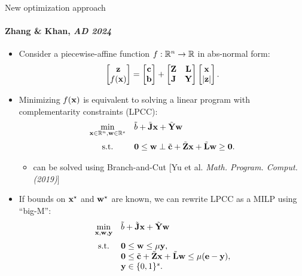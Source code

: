 \documentclass[10pt]{beamer}
\begin{document}
\begin{frame}{New optimization approach}
\framesubtitle{Zhang \& Khan, \emph{AD 2024}} 
\begin{itemize}\setlength{\itemsep}{5pt}
    \item Consider a piecewise-affine function $f: \mathbb{R}^n \rightarrow \mathbb{R}$ in abs-normal form:
    \[
    \begin{bmatrix}
      \mathbf{z} \\ f(\mathbf{x})
    \end{bmatrix}
    =
    \begin{bmatrix}
      \mathbf{c} \\ \mathbf{b}
    \end{bmatrix}
    +
    \begin{bmatrix}
      \mathbf{Z} & \mathbf{L} \\ \mathbf{J} & \mathbf{Y}
    \end{bmatrix}
    \begin{bmatrix}
      \mathbf{x} \\ |\mathbf{z}|
    \end{bmatrix}.
    \]
    \item Minimizing $f(\mathbf{x})$ is equivalent to solving a linear program with complementarity constraints (LPCC):
    \[
    \begin{array}{cl}
      \displaystyle \min_{\x\in\reals^n,\w\in\reals^s} & \tilde{b} + \tilde{\J}\x + \tilde{\Y}\w \medskip\\
      \mathrm{s.t.} & \0 \leq \w\perp\tilde{\cc} + \tilde{\Z}\x + \tilde{\LL}\w\geq \0.
    \end{array}
    \]
    \begin{itemize}\setlength{\itemsep}{3pt}
        \item can be solved using Branch-and-Cut [Yu et al. \emph{Math. Program. Comput. (2019)}]
    \end{itemize}
    \item If bounds on $\mathbf{x}^\star$ and $\mathbf{w}^\star$ are known, we can rewrite LPCC as a MILP using ``big-M'':
    \[
    \begin{array}{cl}
      \displaystyle \min_{\x,\w,\y}& \tilde{b} + \tilde{\J}\x + \tilde{\Y}\w
        \medskip \\
      \mathrm{s.t.} & \0 \leq \w \leq \mu \y, \\
      & \0 \leq \tilde{\cc} + \tilde{\Z}\x + \tilde{\LL}\w \leq \mu(\e-\y), \\
      & \y\in\{0,1\}^s.
    \end{array}
    \]
\end{itemize}
\end{frame}
\end{document}
